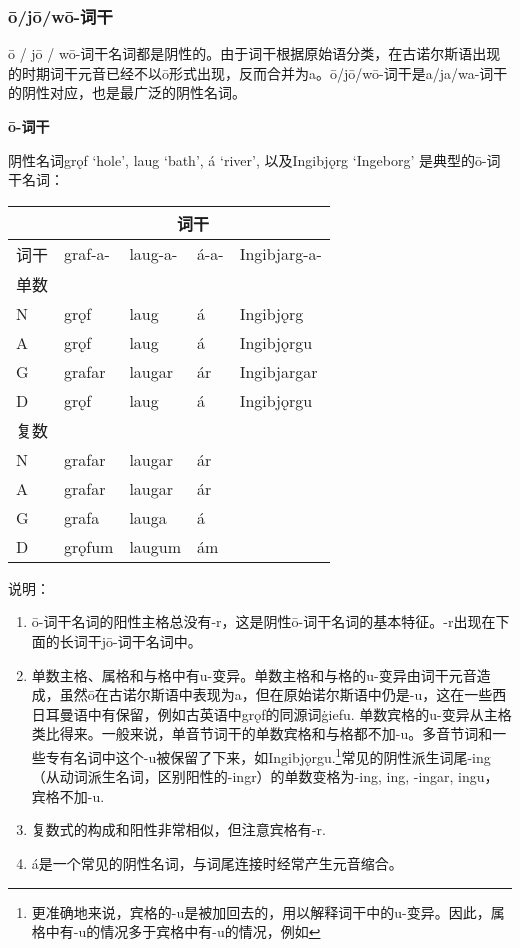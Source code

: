 \subsubsection{ō/jō/wō-词干}\label{ux14djux14dwux14d-ux8bcdux5e72}

ō / jō /
wō-词干名词都是阴性的。由于词干根据原始语分类，在古诺尔斯语出现的时期词干元音已经不以ō形式出现，反而合并为a。ō/jō/wō-词干是a/ja/wa-词干的阴性对应，也是最广泛的阴性名词。

\textbf{ō-词干}

阴性名词grǫf `hole', laug `bath', á `river‌', 以及Ingibjǫrg `Ingeborg‌'
是典型的ō-词干名词：

\begin{longtable}{lllll}
\toprule
 &\multicolumn{4}{c}{词干} \\
\midrule
\endhead
\bottomrule
\endfoot
词干 & graf-a- & laug-a- & á-a- & Ingibjarg-a- \\
单数 & & & & \\
N & grǫf & laug & á & Ingibjǫrg \\
A & grǫf & laug & á & Ingibjǫrgu \\
G & grafar & laugar & ár & Ingibjargar \\
D & grǫf & laug & á & Ingibjǫrgu \\
复数 & & & & \\
N & grafar & laugar & ár & \\
A & grafar & laugar & ár & \\
G & grafa & lauga & á & \\
D & grǫfum & laugum & ám & \\
\end{longtable}

说明：

\begin{enumerate}
\def\labelenumi{\arabic{enumi})}
\item
  ō-词干名词的阳性主格总没有-r，这是阴性ō-词干名词的基本特征。-r出现在下面的长词干jō-词干名词中。
\item
  单数主格、属格和与格中有u-变异。单数主格和与格的u-变异由词干元音造成，虽然ō在古诺尔斯语中表现为a，但在原始诺尔斯语中仍是-u，这在一些西日耳曼语中有保留，例如古英语中grǫf的同源词ġiefu.
  单数宾格的u-变异从主格类比得来。一般来说，单音节词干的单数宾格和与格都不加-u。多音节词和一些专有名词中这个-u被保留了下来，如Ingibjǫrgu.\footnote{更准确地来说，宾格的-u是被加回去的，用以解释词干中的u-变异。因此，属格中有-u的情况多于宾格中有-u的情况，例如}常见的阴性派生词尾-ing（从动词派生名词，区别阳性的-ingr）的单数变格为-ing,
  ing, -ingar, ingu，宾格不加-u.
\item
  复数式的构成和阳性非常相似，但注意宾格有-r.
\item
  á是一个常见的阴性名词，与词尾连接时经常产生元音缩合。
\end{enumerate}

